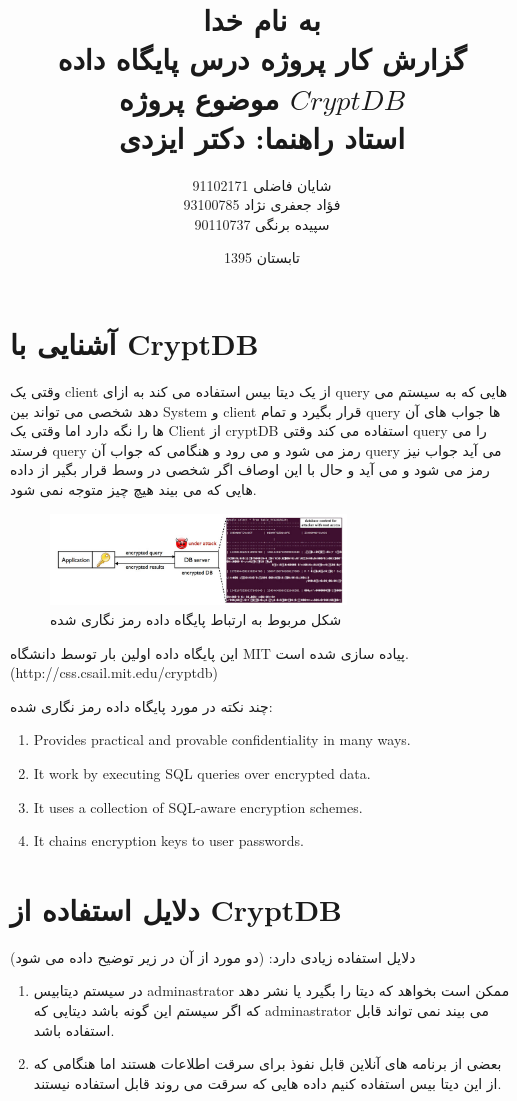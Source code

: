 \documentclass[a4paper]{article}
\date{تابستان 1395}
\author{
	شایان فاضلی
	91102171\\
	فؤاد جعفری نژاد 
	93100785\\
	سپیده برنگی
	90110737\\
	}
\title{
		به نام خدا\\
		گزارش کار پروژه درس پایگاه داده\\
		موضوع پروژه $CryptDB$\\
		استاد راهنما: دکتر ایزدی
		}
\begin{document}
			\maketitle
			\tableofcontents
			\newpage
			\section{آشنایی با CryptDB}
			وقتی یک
			client
			از یک دیتا بیس استفاده می کند به ازای 
			query
			هایی که به سیستم می دهد شخصی می تواند بین System 
			و 
			client
			قرار بگیرد و تمام 
			query
			ها جواب های آن ها را نگه دارد اما وقتی یک 
			Client
			از 
			cryptDB
			استفاده می کند وقتی 
			query  
			را می فرستد 
			query
			رمز می شود و می رود و هنگامی که جواب آن 
			query
			می آید جواب نیز رمز می شود و می آید و حال با این اوصاف اگر شخصی در وسط قرار بگیر از داده هایی که می بیند هیچ چیز متوجه نمی شود.\\
				\begin{figure}[h]
					\centering
					\includegraphics[width=0.7\textwidth]{im1.jpg}
					\caption{شکل مربوط به ارتباط پایگاه داده رمز نگاری شده}
				\end{figure}
				
			این پایگاه داده اولین بار توسط دانشگاه 
			MIT
			پیاده سازی شده است.(http://css.csail.mit.edu/cryptdb)
			
			چند نکته در مورد پایگاه داده رمز نگاری شده:
			\begin{latin}
				\begin{enumerate}
					\item
					Provides practical and provable confidentiality in many ways.
					\item
					It work by executing SQL queries over encrypted data.
					\item
					It uses a collection of SQL-aware encryption schemes.
					\item
					It chains encryption keys to user passwords.
				\end{enumerate}
			\end{latin}
			
			\section{دلایل استفاده از CryptDB}
			دلایل استفاده زیادی دارد:  (دو مورد از آن در زیر توضیح داده می شود)
			\begin{enumerate}
				\item
				در سیستم دیتابیس 
				adminastrator
				ممکن است بخواهد که دیتا را بگیرد یا نشر دهد که اگر سیستم این گونه باشد دیتایی که adminastrator می بیند نمی تواند قابل استفاده باشد.
				
				\item
				بعضی از برنامه های آنلاین قابل نفوذ برای سرقت اطلاعات هستند اما هنگامی که از این دیتا بیس استفاده کنیم داده هایی که سرقت می روند قابل استفاده نیستند.
				\end{enumerate}
\end{document}

